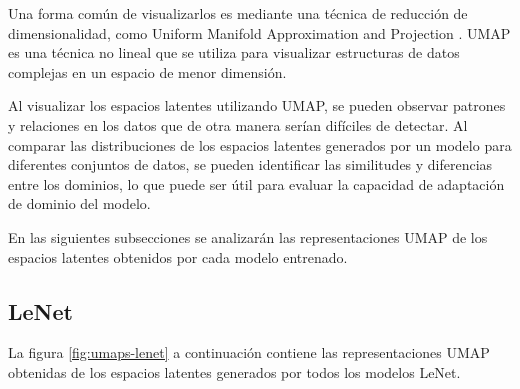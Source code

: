 Una forma común de visualizarlos es mediante una técnica de reducción de dimensionalidad, como Uniform Manifold
Approximation and Projection \parencite{mcinnes2018umap}. UMAP es una técnica no lineal que se utiliza para visualizar estructuras de datos complejas en
un espacio de menor dimensión.

Al visualizar los espacios latentes utilizando UMAP, se pueden observar patrones y relaciones en los datos que de otra
manera serían difíciles de detectar. Al comparar las distribuciones de los espacios latentes generados por un modelo
para diferentes conjuntos de datos, se pueden identificar las similitudes y diferencias entre los dominios, lo que
puede ser útil para evaluar la capacidad de adaptación de dominio del modelo.

En las siguientes subsecciones se analizarán las representaciones UMAP de los espacios latentes obtenidos por cada
modelo entrenado.

\subsection{LeNet}

La figura \ref{fig:umaps-lenet} a continuación contiene las representaciones UMAP obtenidas de los espacios latentes
generados por todos los modelos LeNet.

